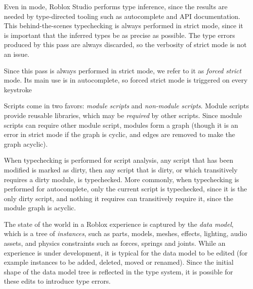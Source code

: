 \documentclass[english,submission,cleveref]{programming}
\begin{document}
Even in \mnocheck{} mode, {Roblox Studio} performs type inference, since
the results are needed by type-directed tooling such as autocomplete and
API documentation. This behind-the-scenes typechecking is always performed
in strict mode, since it is important that the inferred types be as precise
as possible. The type errors produced by this pass are always discarded,
so the verbosity of strict mode is not an issue.

Since this pass is always performed in strict mode, we refer to it as
\emph{forced strict} mode. Its main use is in autocomplete, so forced
strict mode is triggered on every keystroke

Scripts come in two favors: \emph{module scripts} and \emph{non-module
scripts}.  Module scripts provide reusable libraries, which may be
\emph{required} by other scripts. Since module scripts can require
other module script, modules form a graph (though it is
an error in strict mode if the graph is cyclic, and edges are removed to
make the graph acyclic).

When typechecking is performed for script analysis, any script that
has been modified is marked as dirty, then any script that is dirty,
or which transitively requires a dirty module, is typechecked. More
commonly, when typechecking is performed for autocomplete, only
the current script is typechecked, since it is the only dirty
script, and nothing it requires can transitively require it, since
the module graph is acyclic.

The state of the world in a {Roblox} experience is captured by
the \emph{data model}, which is a tree of \emph{instances}, such as
parts, models, meshes, effects, lighting, audio assets, and physics
constraints such as forces, springs and joints.
While an experience is under development, it is typical for the data
model to be edited (for example instances to be added, deleted, moved
or renamed). Since the initial shape of the data model tree is reflected in
the type system, it is possible for these edits to introduce type errors.

\end{document}
